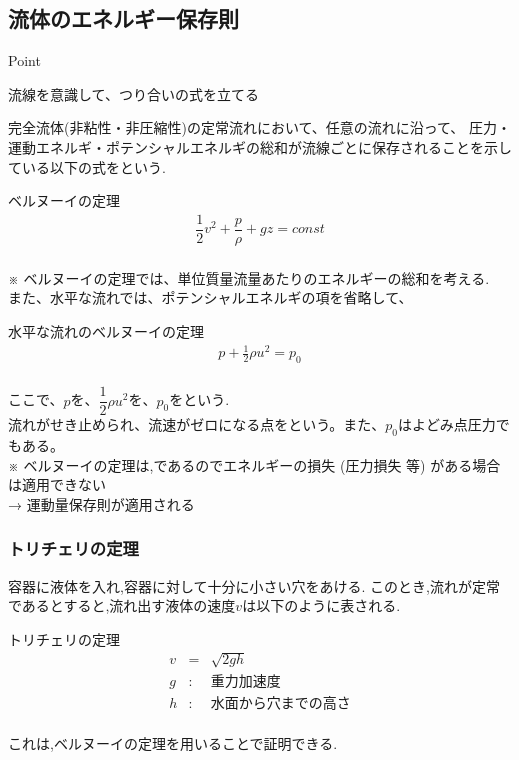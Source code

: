 \documentclass[a4paper]{jsarticle}
\begin{document}
\subsection{流体のエネルギー保存則}
\begin{itembox}[l]{Point}
    \begin{center}
        流線を意識して、つり合いの式を立てる
    \end{center}
\end{itembox}
完全流体(非粘性・非圧縮性)の定常流れにおいて、任意の流れに沿って、
圧力・運動エネルギ・ポテンシャルエネルギの総和が流線ごとに保存されることを示している以下の式をという.
\begin{itembox}[l]{ベルヌーイの定理}
    \begin{eqnarray*}
        \dfrac{1}{2}v^2+\dfrac{p}{\rho}+gz=const\\
    \end{eqnarray*}
\end{itembox}
※ ベルヌーイの定理では、単位質量流量あたりのエネルギーの総和を考える.\\
また、水平な流れでは、ポテンシャルエネルギの項を省略して、
\begin{itembox}[l]{水平な流れのベルヌーイの定理}
    \begin{eqnarray*}
        p+\frac{1}{2}\rho u^2 =p_0\\
    \end{eqnarray*}
\end{itembox}
ここで、$p$を、$\dfrac{1}{2}\rho u^2$を、$p_0$をという.\\
流れがせき止められ、流速がゼロになる点をという。また、$p_0$はよどみ点圧力でもある。\\
※ ベルヌーイの定理は,であるのでエネルギーの損失 (圧力損失 等) がある場合は適用できない\\
→ 運動量保存則が適用される\\
\subsubsection{トリチェリの定理}
容器に液体を入れ,容器に対して十分に小さい穴をあける.
このとき,流れが定常であるとすると,流れ出す液体の速度$v$は以下のように表される.
\begin{itembox}[l]{トリチェリの定理}
    \begin{eqnarray*}
        v&=&\sqrt{2gh}\\
        g&:&重力加速度\\
        h&:&水面から穴までの高さ\\
    \end{eqnarray*}
\end{itembox}
これは,ベルヌーイの定理を用いることで証明できる.
\end{document}
